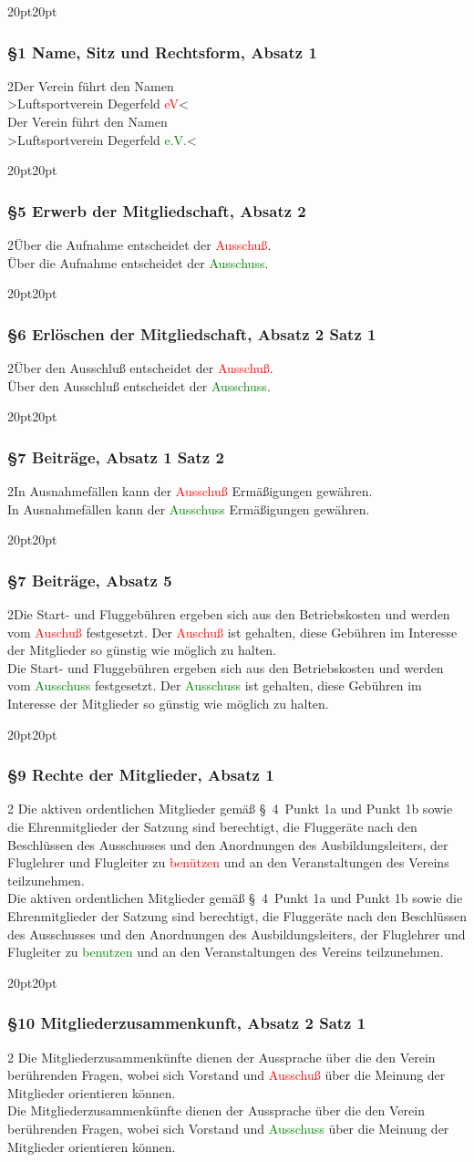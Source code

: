 \documentclass[10pt,a4paper,parskip=half]{scrartcl}
\newcommand{\new}[1]{\textcolor{Green}{#1}}
\newcommand{\old}[1]{\textcolor{Red}{#1}}
\newcommand{\change}[1]{
  \begin{adjustwidth}{20pt}{20pt}
    #1
  \end{adjustwidth}
}
\newcommand{\compare}[3]{\change{\subsubsection*{#1}\begin{multicols}{2}#2\columnbreak\\#3\end{multicols}}}
\begin{document}
\compare{§1 Name, Sitz und Rechtsform, Absatz 1}
{Der Verein führt den Namen\\>Luftsportverein Degerfeld \old{eV}<}
{Der Verein führt den Namen\\>Luftsportverein Degerfeld \new{e.V.}<}

\compare{§5 Erwerb der Mitgliedschaft, Absatz 2}{Über die Aufnahme entscheidet der \old{Ausschuß}.}{Über die Aufnahme entscheidet der \new{Ausschuss}.}

\compare{§6 Erlöschen der Mitgliedschaft, Absatz 2 Satz 1}
{Über den Ausschluß entscheidet der \old{Ausschuß}.}
{Über den Ausschluß entscheidet der \new{Ausschuss}.}

\compare{§7 Beiträge, Absatz 1 Satz 2}
{In Ausnahmefällen kann der \old{Ausschuß} Ermäßigungen gewähren.}
{In Ausnahmefällen kann der \new{Ausschuss} Ermäßigungen gewähren.}

\compare{§7 Beiträge, Absatz 5}
{Die Start- und Fluggebühren ergeben sich aus den Betriebskosten und werden vom \old{Auschuß} festgesetzt.
  Der \old{Auschuß} ist gehalten,
  diese Gebühren im Interesse der Mitglieder so günstig wie möglich zu halten.}
{Die Start- und Fluggebühren ergeben sich aus den Betriebskosten und werden vom \new{Ausschuss} festgesetzt.
  Der \new{Ausschuss} ist gehalten,
  diese Gebühren im Interesse der Mitglieder so günstig wie möglich zu halten.}

\compare{§9 Rechte der Mitglieder, Absatz 1}{
  Die aktiven ordentlichen Mitglieder gemäß §~4~Punkt 1a und Punkt 1b
  sowie die Ehrenmitglieder der Satzung sind berechtigt,
  die Fluggeräte nach den Beschlüssen des Ausschusses und den Anordnungen des Ausbildungsleiters,
  der Fluglehrer und Flugleiter zu \old{benützen} und an den Veranstaltungen des Vereins teilzunehmen.
}{
  Die aktiven ordentlichen Mitglieder gemäß §~4~Punkt 1a und Punkt 1b
  sowie die Ehrenmitglieder der Satzung sind berechtigt,
  die Fluggeräte nach den Beschlüssen des Ausschusses und den Anordnungen des Ausbildungsleiters,
  der Fluglehrer und Flugleiter zu \new{benutzen} und an den Veranstaltungen des Vereins teilzunehmen.
}

\compare{§10 Mitgliederzusammenkunft, Absatz 2 Satz 1}{
  Die Mitgliederzusammenkünfte dienen der Aussprache über die den Verein berührenden Fragen,
  wobei sich Vorstand und \old{Ausschuß} über die Meinung der Mitglieder orientieren können.
}{
  Die Mitgliederzusammenkünfte dienen der Aussprache über die den Verein berührenden Fragen,
  wobei sich Vorstand und \new{Ausschuss} über die Meinung der Mitglieder orientieren können.
}
\end{document}
